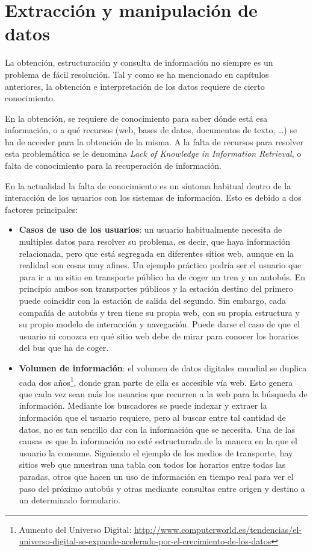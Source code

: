 \chapter{Extracción y manipulación de datos}

La obtención, estructuración y consulta de información no siempre es un problema de fácil resolución. Tal y como se ha mencionado en capítulos anteriores, la obtención e interpretación de los datos requiere de cierto conocimiento.

En la obtención, se requiere de conocimiento para saber dónde está esa información, o a qué recursos (web, bases de datos, documentos de texto, \dots) se ha de acceder para la obtención de la misma. A la falta de recursos para resolver esta problemática se le denomina \emph{Lack of Knowledge in Information Retrieval}, o falta de conocimiento para la recuperación de información.

En la actualidad la falta de conocimiento es un síntoma habitual dentro de la interacción de los usuarios con los sistemas de información. Esto es debido a dos factores principales:
\begin{itemize}  
	\item \textbf{Casos de uso de los usuarios}: un usuario habitualmente necesita de multiples datos para resolver su problema, es decir, que haya información relacionada, pero que está segregada en diferentes sitios web, aunque en la realidad son cosas muy afines. Un ejemplo práctico podría ser el usuario que para ir a un sitio en transporte público ha de coger un tren y un autobús. En principio ambos son transportes públicos y la estación destino del primero puede coincidir con la estación de salida del segundo. Sin embargo, cada compañía de autobús y tren tiene su propia web, con su propia estructura y su propio modelo de interacción y navegación. Puede darse el caso de que el usuario ni conozca en qué sitio web debe de mirar para conocer los horarios del bus que ha de coger. 
	\item \textbf{Volumen de información}: el volumen de datos digitales mundial se duplica cada dos años\footnote{Aumento del Universo Digital: \url{http://www.computerworld.es/tendencias/el-universo-digital-se-expande-acelerado-por-el-crecimiento-de-los-datos}}, donde gran parte de ella es accesible vía web. Esto genera que cada vez sean más los usuarios que recurren a la web para la búsqueda de información. Mediante los buscadores se puede indexar y extraer la información que el usuario requiere, pero al buscar entre tal cantidad de datos, no es tan sencillo dar con la información que se necesita. Una de las causas es que la información no esté estructurada de la manera en la que el usuario la consume. Siguiendo el ejemplo de los medios de transporte, hay sitios web que muestran una tabla con todos los horarios entre todas las paradas, otros que hacen un uso de información en tiempo real para ver el paso del próximo autobús y otras mediante consultas entre origen y destino a un determinado formulario.
\end{itemize}

